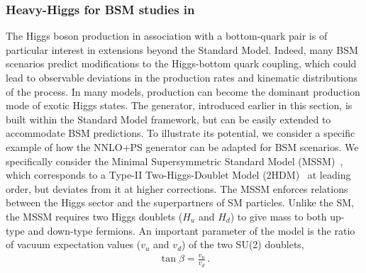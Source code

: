 \documentclass[11pt,a4paper]{article}
\begin{document}
\subsubsection{Heavy-Higgs for BSM studies in \minnlo{}}

The Higgs boson production in association with a bottom-quark pair is of particular interest in extensions beyond the Standard Model. Indeed, many BSM scenarios predict modifications to the Higgs-bottom quark coupling, which could lead to observable deviations in the production rates and kinematic distributions of the \bbH{} process. In many models, \bbH{} production can become the dominant production mode of exotic Higgs states. The \minnlo{} generator, introduced earlier in this section, is built within the Standard Model framework, but can be easily extended to accommodate BSM predictions. To illustrate its potential, we consider a specific example of how the NNLO+PS generator can be adapted for BSM scenarios. We specifically consider the Minimal Supersymmetric Standard Model (MSSM)~\cite{Fayet:1974pd,Fayet:1976et,Fayet:1977yc,Ovrut:1984uc,Haber:1984rc,Gunion:1984yn}, which corresponds to a Type-II Two-Higgs-Doublet Model (2HDM)~\cite{Branco:2011iw} at leading order, but deviates from it at higher corrections. The MSSM enforces relations between the Higgs sector and the superpartners of SM particles. Unlike the SM, the MSSM requires two Higgs doublets ($H_u$ and $H_d$) to give mass to both up-type and down-type fermions. An important parameter of the model is the ratio of vacuum expectation values ($v_u$ and $v_d$) of the two SU(2) doublets,
\begin{align}
	\tan\beta=\frac{v_u}{v_d}\,.
\end{align}
\end{document}
